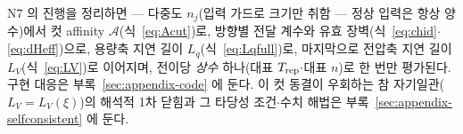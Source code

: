 N7 의 진행을 정리하면 --- 다중도 $n_j$(입력 가드로 크기만 취함 --- 정상 입력은 항상 양수)에서 컷 affinity $\mathcal A$(식~\eqref{eq:Acut})로,
방향별 전달 계수와 유효 장벽(식~\eqref{eq:chid}$\cdot$\eqref{eq:dHeff})으로, 용량축 지연 길이
$L_q$(식~\eqref{eq:Lqfull})로, 마지막으로 전압축 지연 길이 $L_V$(식~\eqref{eq:LV})로 이어지며, 전이당
\emph{상수} 하나(대표 $T_{\mathrm{rep}}\cdot$대표 $n$)로 한 번만 평가된다. 구현 대응은
부록~\ref{sec:appendix-code} 에 둔다. 이 컷 동결이 우회하는 참 자기일관($L_V=L_V(\xi)$)의 해석적 1차 닫힘과 그
타당성 조건$\cdot$수치 해법은 부록~\ref{sec:appendix-selfconsistent} 에 둔다.


